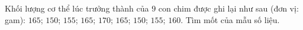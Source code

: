 \begin{ex}
Khối lượng cơ thể lúc trưởng thành của $9$ con chim được ghi lại như sau (đơn vị: gam): $165$; $150$; $155$; $165$; $170$; $165$; $150$; $155$; $160$. Tìm mốt của mẫu số liệu.
\end{ex}
